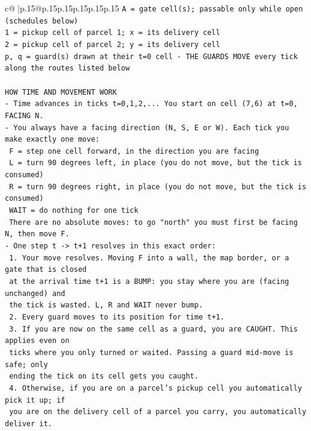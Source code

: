 \documentclass{article}
\begin{document}
{\begin{supertabular}{c@{$\;$}|p{.15\linewidth}@{}p{.15\linewidth}p{.15\linewidth}p{.15\linewidth}p{.15\linewidth}p{.15\linewidth}}
{{{\texttt{A = gate cell(s); passable only while open (schedules below)} \\
\texttt{1 = pickup cell of parcel 1; x = its delivery cell} \\
\texttt{2 = pickup cell of parcel 2; y = its delivery cell} \\
\texttt{p, q = guard(s) drawn at their t=0 cell {-} THE GUARDS MOVE every tick along the routes listed below} \\
\\ 
\texttt{HOW TIME AND MOVEMENT WORK} \\
\texttt{{-} Time advances in ticks t=0,1,2,... You start on cell (7,6) at t=0, FACING N.} \\
\texttt{{-} You always have a facing direction (N, S, E or W). Each tick you make exactly one move:} \\
\texttt{  F    = step one cell forward, in the direction you are facing} \\
\texttt{  L    = turn 90 degrees left, in place (you do not move, but the tick is consumed)} \\
\texttt{  R    = turn 90 degrees right, in place (you do not move, but the tick is consumed)} \\
\texttt{  WAIT = do nothing for one tick} \\
\texttt{  There are no absolute moves: to go "north" you must first be facing N, then move F.} \\
\texttt{{-} One step t {-}> t+1 resolves in this exact order:} \\
\texttt{  1. Your move resolves. Moving F into a wall, the map border, or a gate that is closed} \\
\texttt{     at the arrival time t+1 is a BUMP: you stay where you are (facing unchanged) and} \\
\texttt{     the tick is wasted. L, R and WAIT never bump.} \\
\texttt{  2. Every guard moves to its position for time t+1.} \\
\texttt{  3. If you are now on the same cell as a guard, you are CAUGHT. This applies even on} \\
\texttt{     ticks where you only turned or waited. Passing a guard mid{-}move is safe; only} \\
\texttt{     ending the tick on its cell gets you caught.} \\
\texttt{  4. Otherwise, if you are on a parcel's pickup cell you automatically pick it up; if} \\
\texttt{     you are on the delivery cell of a parcel you carry, you automatically deliver it.} \\
}}}
\end{supertabular}}
\end{document}
